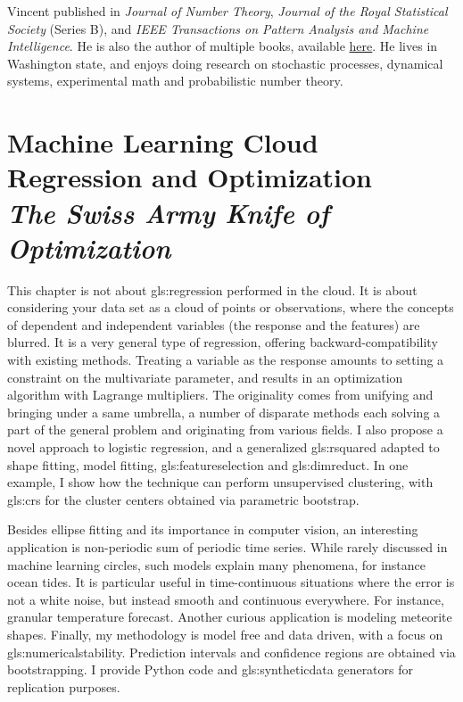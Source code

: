 \documentclass[oneside,10pt]{book}
\newcommand\Chapter[2]{
  \chapter[#1]{#1\\[2ex]\Large\itshape#2}
}
\begin{document}
Vincent published in {\em Journal of Number Theory}, {\em Journal of the Royal Statistical Society} (Series B), and {\em IEEE Transactions on Pattern Analysis and Machine Intelligence}. He is also the author of multiple books, available \href{https://mltechniques.com/resources/}{here}. He lives  in Washington state, and enjoys doing research on stochastic processes, dynamical systems, experimental math and probabilistic number theory.

\hypersetup{linkcolor=red}
\tableofcontents 

\Chapter{Machine Learning Cloud Regression and Optimization}{The Swiss Army Knife of Optimization} 

This chapter is not about \gls{gls:regression} performed in the cloud. It is about considering your data set as a cloud of points or observations, where the
 concepts of dependent and independent variables (the response and the features) are blurred. It is a very general type of regression, offering
 backward-compatibility with existing methods. Treating a variable as the response amounts to setting a constraint on the multivariate parameter, and results in an optimization algorithm with  Lagrange multipliers. The originality comes from unifying and bringing under a same umbrella, a number of disparate methods each solving a part of the general problem and originating from various fields. I also 
 propose a novel approach to logistic regression, and a generalized \gls{gls:rsquared} adapted to shape fitting, model fitting, \gls{gls:featureselection} 
and  \gls{gls:dimreduct}.  In one example, I show how the technique can perform unsupervised clustering, with \glspl{gls:cr} for
 the cluster centers obtained via parametric bootstrap.

Besides ellipse fitting and its importance in \textcolor{index}{computer vision}, an interesting application is non-periodic sum of periodic time series. While rarely discussed in machine learning circles, such models explain many phenomena, for instance ocean tides. It is particular useful in time-continuous situations where the error is not a white noise, but instead smooth and continuous everywhere. For instance, granular temperature forecast.  Another curious application is modeling meteorite shapes. Finally, my methodology is model free and data driven, with a focus on \gls{gls:numericalstability}. Prediction intervals and confidence regions
 are obtained via bootstrapping. I provide Python code and \gls{gls:syntheticdata} generators for replication purposes. 
\end{document}
